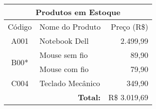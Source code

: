 \documentclass{standalone}
\begin{document}
\centering
\begin{tabular}{|c|l|r|}
    \hline
    \multicolumn{3}{|c|}{\textbf{Produtos em Estoque}} \\
    \hline
    Código & Nome do Produto & Preço (R\$) \\
    
    \hline
    A001 & Notebook Dell & 2.499,99 \\
    \hline
    \multirow{2}{*}{B00*} & Mouse sem fio & 89,90 \\
    \cline{2-3}
    & Mouse com fio & 79,90 \\
    \hline
    C004 & Teclado Mecânico & 349,90 \\
    \hline
    \multicolumn{2}{|r|}{\textbf{Total:}} & R\$ 3.019,69 \\
    \hline
\end{tabular}
\end{document}
